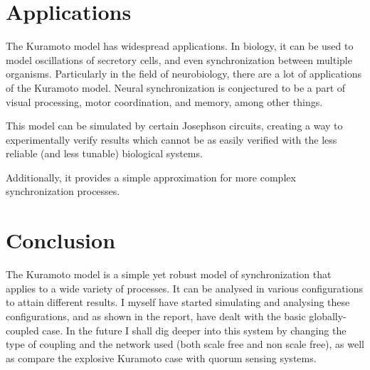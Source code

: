 \documentclass[12pt]{article}
\begin{document}
\section{Applications}
The Kuramoto model has widespread applications. In biology, it can be used to model oscillations of secretory cells, and even synchronization between multiple organisms\cite{winfree1967biological}. Particularly in the field of neurobiology, there are a lot of applications of the Kuramoto model\cite{breakspear2010generative}\cite{cumin2007generalising}. Neural synchronization is conjectured to be a part of visual processing\cite{sompolinsky1991cooperative}, motor coordination\cite{cassidy2002movement}, and memory\cite{klimesch1996memory}, among other things.

This model can be simulated by certain Josephson circuits\cite{wiesenfeld1998frequency}, creating a way to experimentally verify results which cannot be as easily verified with the less reliable (and less tunable) biological systems.

Additionally, it provides a simple approximation for more complex synchronization processes.
\section{Conclusion}
The Kuramoto model is a simple yet robust model of synchronization that applies to a wide variety of processes. It can be analysed in various configurations to attain different results. I myself have started simulating and analysing these configurations, and as shown in the report, have dealt with the basic globally-coupled case. In the future I shall dig deeper into this system by changing the type of coupling and the network used (both scale free and non scale free), as well as compare the explosive Kuramoto case with quorum sensing systems.


\end{document}
